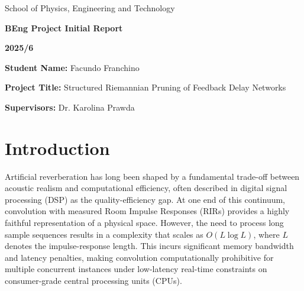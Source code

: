 \documentclass[12pt,a4paper]{article}
\begin{document}
\begin{titlepage}
\thispagestyle{empty}
\sffamily

\begin{center}
\vspace*{3.7cm}
{\Large School of Physics, Engineering and Technology}

\vspace{3.1cm}
{\fontsize{24}{28}\selectfont \textbf{BEng Project Initial Report}}

\vspace{1.3cm}
{\fontsize{22}{26}\selectfont \textbf{2025/6}}
\end{center}

\vfill
\noindent\textbf{Student Name:} Facundo Franchino

\vspace{1.2cm}
\noindent\textbf{Project Title:} Structured Riemannian Pruning of Feedback Delay Networks

\vspace{1.2cm}
\noindent\textbf{Supervisors:} Dr. Karolina Prawda

\end{titlepage}

\begin{abstract}
This thesis proposes a novel, generalisable mathematical and computational method to prune 
feedback delay networks for optimal real-time running (?). The method serves applications
such as;
\item Creating the "fastest white noise generator", that is; pruning an arbitrary 
higher order feedback delay network such as $N=1024$ or $N=4096$.
\item Towards real-time differentiable reverbs. Applications such as being able to create a
real-time viable FDN mimic of a RIR via the combination
of differentiable digital signal processing techniques and the proposed pruning method.
 

\end{abstract}

\clearpage

\section{Introduction}
Artificial reverberation has long been shaped by a 
fundamental trade-off between acoustic realism and computational efficiency,
often described in digital signal processing (DSP) as the quality-efficiency
gap.
At one end of this continuum, convolution with measured
Room Impulse Responses (RIRs) provides a highly faithful representation of a physical space.
However, the need to process long sample sequences results in a
complexity that scales as $O(L \log L)$, where $L$ denotes the impulse-response length.
This incurs significant memory bandwidth and latency penalties, making convolution 
computationally prohibitive for multiple concurrent instances under low-latency real-time 
constraints on consumer-grade central processing units (CPUs).
\end{document}
